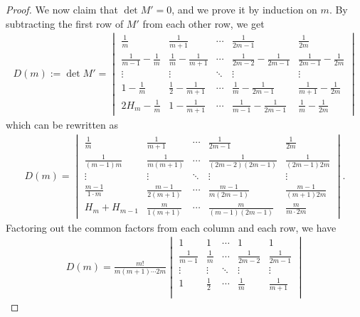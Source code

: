 \documentclass[11pt]{amsart}
\theoremstyle{definition}
\numberwithin{equation}{subsection}
\theoremstyle{plain}
\theoremstyle{plain}
\theoremstyle{plain}
\theoremstyle{plain}
\theoremstyle{plain}
\theoremstyle{plain}
\theoremstyle{plain}
\theoremstyle{plain}
\theoremstyle{plain}
\theoremstyle{plain}
\theoremstyle{plain}
\theoremstyle{plain}
\theoremstyle{definition}
\theoremstyle{definition}
\theoremstyle{definition}
\theoremstyle{remark}
\renewcommand{\(}{\textup{(}}
\renewcommand{\)}{\textup{)}}
\begin{document}
\begin{proof}
We now claim that $\det M'=0$, and we prove it by induction on $m$. By subtracting the first row of $M'$ from each other row, we get
    \begin{align*}
       D(m):= \det M'=
        \begin{vmatrix}
          \frac{1}{m} & \frac{1}{m+1} & \cdots & \frac{1}{2m-1} & \frac{1}{2m}\\
          \frac{1}{m-1}-\frac{1}{m} & \frac{1}{m}-\frac{1}{m+1} & \cdots
           & \frac{1}{2m-2}-\frac{1}{2m-1} & \frac{1}{2m-1}-\frac{1}{2m} \\
          \vdots & \vdots & \ddots & \vdots & \vdots \\
          1-\frac{1}{m} & \frac{1}{2}-\frac{1}{m+1} & \cdots
           & \frac{1}{m}-\frac{1}{2m-1} & \frac{1}{m+1}-\frac{1}{2m} \\
          2H_m-\frac{1}{m} & 1-\frac{1}{m+1} & \cdots
           & \frac{1}{m-1}-\frac{1}{2m-1} & \frac{1}{m}-\frac{1}{2m}
        \end{vmatrix}
    \end{align*}
which can be rewritten as
\begin{align*}
    D(m)=
        \begin{vmatrix}
          \frac{1}{m} & \frac{1}{m+1} & \cdots & \frac{1}{2m-1} & \frac{1}{2m} \\
          \frac{1}{(m-1)m} & \frac{1}{m(m+1)} & \cdots
           & \frac{1}{(2m-2)(2m-1)} & \frac{1}{(2m-1)2m} \\
          \vdots & \vdots & \ddots & \vdots & \vdots \\
          \frac{m-1}{1\cdot m} & \frac{m-1}{2(m+1)} & \cdots
           & \frac{m-1}{m(2m-1)} & \frac{m-1}{(m+1)2m} \\
          H_m+H_{m-1} & \frac{m}{1(m+1)} & \cdots
           & \frac{m}{(m-1)(2m-1)} & \frac{m}{m\cdot2m}
        \end{vmatrix}.
\end{align*}
Factoring out the common factors from each column and each row, we have
    \begin{align*}
        D(m)=
        \frac{m!}{m(m+1)\cdots 2m}
        \begin{vmatrix}
          1 & 1 & \cdots & 1 & 1 \\
          \frac{1}{m-1} & \frac{1}{m} & \cdots
           & \frac{1}{2m-2} & \frac{1}{2m-1} \\
          \vdots & \vdots & \ddots & \vdots & \vdots \\
          1 & \frac{1}{2} & \cdots
           & \frac{1}{m} & \frac{1}{m+1} \\

\end{vmatrix}
\end{align*}
\end{proof}
\end{document}
